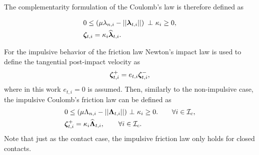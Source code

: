 \documentclass[../DC2017114Bouma.tex]{subfiles}
\begin{document}
The complementarity formulation of the Coulomb's law is therefore defined as

\begin{align}
&0\leq \left(\mu\lambda_{n,i} - ||\lambdab_{t,i}||\right)\ \bot\ \kappa_i \geq 0,\label{eq:coulomb1}\\
&\zetab_{t,i} = \kappa_i\widehat{\lambdab}_{t,i}.\label{eq:coulomb2}
\end{align}

For the impulsive behavior of the friction law Newton's impact law is used to define the tangential post-impact velocity as
\begin{align}
\boldsymbol{\zeta}^+_{t,i} = e_{t,i}\boldsymbol{\zeta}^-_{t,i},
\end{align}
where in this work $e_{t,i}=0$ is assumed. Then, similarly to the non-impulsive case, the impulsive Coulomb's friction law can be defined as
\begin{align}
&0 \leq (\mu\Lambda_{n,i} - ||\boldsymbol{\Lambda}_{t,i}||)\ \bot\ \kappa_i \geq 0. \qquad \forall i\in\mathcal{I}_c,\label{eq:coulombimp1}\\
&\boldsymbol{\zeta}_{t,i}^+ = \kappa_i\widehat{\boldsymbol{\Lambda}}_{t,i},\qquad \forall i\in\mathcal{I}_c.\label{eq:coulombimp2}
\end{align}
Note that just as the contact case, the impulsive friction law only holds for closed contacts.
\end{document}
